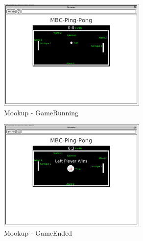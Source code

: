 		\begin{figure}[!htb]
			\centering
			\includegraphics[width=0.65\textwidth]{architecture/Mookup - GameRunning.png}
			\caption{Mookup - GameRunning}
			\label{Mookup - GameRunning}
		\end{figure}
		
		\begin{figure}[!htb]
			\centering
			\includegraphics[width=0.65\textwidth]{architecture/Mookup - GameEnded.png}
			\caption{Mookup - GameEnded}
			\label{Mookup - GameEnded}
		\end{figure}

	\FloatBarrier
